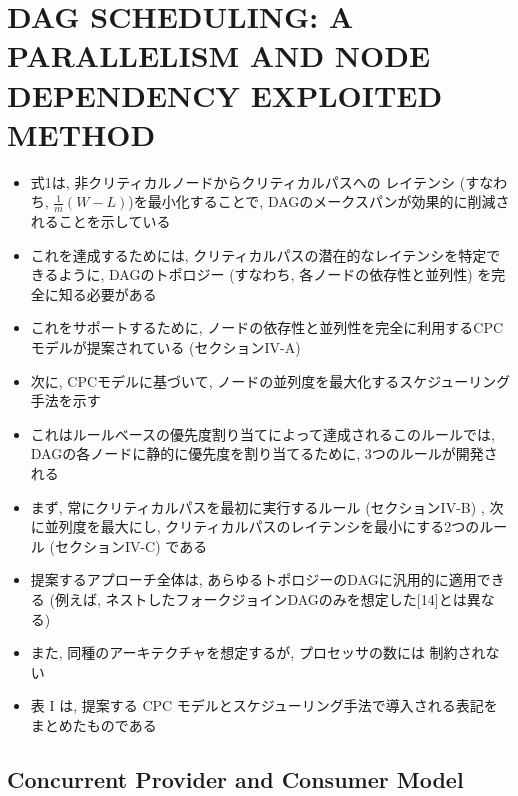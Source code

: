
\section{DAG SCHEDULING: A PARALLELISM AND NODE DEPENDENCY EXPLOITED METHOD}
\label{sec: dag}

\begin{frame}{}
    \begin{itemize}
        \item 式1は, 非クリティカルノードからクリティカルパスへの レイテンシ (すなわち, $\frac{1}{m}(W-L)$)を最小化することで, DAGのメークスパンが効果的に削減されることを示している
        \item これを達成するためには, クリティカルパスの潜在的なレイテンシを特定できるように, DAGのトポロジー (すなわち, 各ノードの依存性と並列性) を完全に知る必要がある
        \item これをサポートするために, ノードの依存性と並列性を完全に利用するCPCモデルが提案されている (セクションIV-A)
    \end{itemize}
\end{frame}

\begin{frame}{}
    \begin{itemize}
        \item 次に, CPCモデルに基づいて, ノードの並列度を最大化するスケジューリング手法を示す
        \item これはルールベースの優先度割り当てによって達成されるこのルールでは, DAGの各ノードに静的に優先度を割り当てるために, 3つのルールが開発される
        \item まず, 常にクリティカルパスを最初に実行するルール (セクションIV-B) , 次に並列度を最大にし, クリティカルパスのレイテンシを最小にする2つのルール (セクションIV-C) である
        \item 提案するアプローチ全体は, あらゆるトポロジーのDAGに汎用的に適用できる (例えば, ネストしたフォークジョインDAGのみを想定した[14]とは異なる)
        \item また, 同種のアーキテクチャを想定するが, プロセッサの数には 制約されない
        \item 表 I は, 提案する CPC モデルとスケジューリング手法で導入される表記をまとめたものである
    \end{itemize}
\end{frame}


\subsection{Concurrent Provider and Consumer Model}
\label{ssec: Concurrent provider and consumer model}

